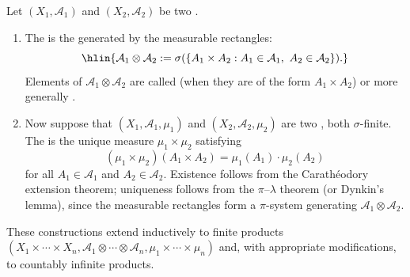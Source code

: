 \begin{definition} \label{definition:product_sigma_algebra_and_product_measure_for_two_measure_spaces}
Let $(X_1, \mathcal{A}_1)$ and $(X_2, \mathcal{A}_2)$ be two .

\begin{enumerate}
    \item The  is the  generated by the measurable rectangles:
    $$\hlin{\mathcal{A}_1 \otimes \mathcal{A}_2 := \sigma(\{ A_1 \times A_2 : A_1 \in \mathcal{A}_1,\ A_2 \in \mathcal{A}_2\}).}$$
    Elements of $\mathcal{A}_1 \otimes \mathcal{A}_2$ are called  (when they are of the form $A_1 \times A_2$) or more generally .

    \item Now suppose that $(X_1, \mathcal{A}_1, \mu_1)$ and $(X_2, \mathcal{A}_2, \mu_2)$ are two , both $\sigma$-finite. The  is the unique measure $\mu_1 \times \mu_2$ satisfying
    $$(\mu_1 \times \mu_2)(A_1 \times A_2) = \mu_1(A_1) \cdot \mu_2(A_2)$$
    for all $A_1 \in \mathcal{A}_1$ and $A_2 \in \mathcal{A}_2$. Existence follows from the Carathéodory extension theorem; uniqueness follows from the $\pi$--$\lambda$ theorem (or Dynkin's lemma), since the measurable rectangles form a $\pi$-system generating $\mathcal{A}_1 \otimes \mathcal{A}_2$.
\end{enumerate}

These constructions extend inductively to finite products $(X_1 \times \cdots \times X_n, \mathcal{A}_1 \otimes \cdots \otimes \mathcal{A}_n, \mu_1 \times \cdots \times \mu_n)$ and, with appropriate modifications, to countably infinite products.
\end{definition}
